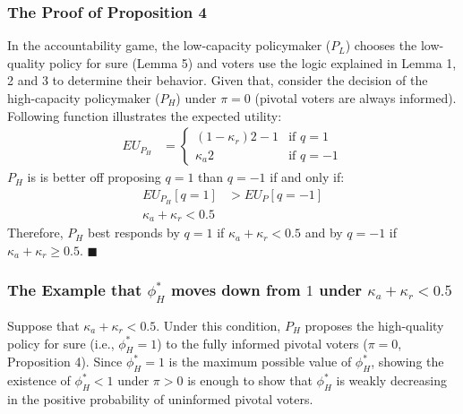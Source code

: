 \subsubsection{The Proof of Proposition 4}

\par In the accountability game, the low-capacity policymaker ($P_L$) chooses the low-quality policy for sure (Lemma 5) and voters use the logic explained in Lemma 1, 2 and 3 to determine their behavior. Given that, consider the decision of the high-capacity policymaker ($P_H$) under $\pi=0$ (pivotal voters are always informed). Following function illustrates the expected utility:
\begin{align*}
EU_{P_H} &= 
\begin{cases}
(1-\kappa_{r}) 2 - 1  & \text{if $q=1$} \\
\kappa_{a} 2  & \text{if $q=-1$} 
\end{cases} 
\end{align*}
$P_H$ is is better off proposing $q=1$ than $q=-1$ if and only if:
\begin{align*}
EU_{P_H}[q=1] &> EU_P[q=-1] \\
\kappa_{a} + \kappa_{r} < 0.5
\end{align*}
Therefore, $P_H$ best responds by $q=1$ if $\kappa_{a} + \kappa_{r} < 0.5$ and by $q=-1$ if $\kappa_{a} + \kappa_{r} \geq 0.5$. 
\hfill $\blacksquare$

\subsubsection{The Example that $\phi^*_H$ moves down from $1$ under $\kappa_{a} + \kappa_{r} < 0.5$}

\par Suppose that $\kappa_a+\kappa_r<0.5$. Under this condition, $P_H$ proposes the high-quality policy for sure (i.e., $\phi^*_H=1$) to the fully informed pivotal voters ($\pi=0$, Proposition 4). Since $\phi^*_H=1$ is the maximum possible value of $\phi^*_H$, showing the existence of $\phi^*_H<1$ under $\pi>0$ is enough to show that $\phi^*_H$ is weakly decreasing in the positive probability of uninformed pivotal voters. 

